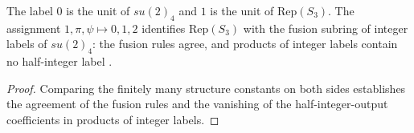 \begin{lemma}%
    \label{thm:mposym_su24_reps3_units}
    \leanok
    The label $0$ is the unit of $su(2)_4$ and $1$ is the unit of
    $\mathrm{Rep}(S_3)$. The assignment $1,\pi,\psi\mapsto0,1,2$ identifies
    $\mathrm{Rep}(S_3)$ with the fusion subring of integer labels of
    $su(2)_4$: the fusion rules agree, and products of integer labels contain
    no half-integer label \cite[Section~6]{GarreRubio2023MPOSym}.
\end{lemma}

\begin{proof}
    \leanok
    Comparing the finitely many structure constants on both sides establishes
    the agreement of the fusion rules and the vanishing of the
    half-integer-output coefficients in products of integer labels.
\end{proof}

